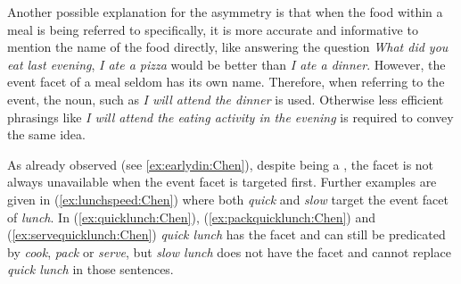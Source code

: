 \documentclass[output=paper,colorlinks,citecolor=brown,chinesefont]{langscibook}
\begin{document}
Another possible explanation for the asymmetry is that when the food within a meal is being referred to specifically, it is more accurate and informative to mention the name of the food directly, like answering the question \emph{What did you eat last evening}, \emph{I ate a pizza} would be better than \emph{I ate a dinner}. However, the event facet of a meal seldom has its own name. 
Therefore, when referring to the event, the  noun, such as \emph{I will attend the dinner} is used. Otherwise less efficient phrasings like \emph{I will attend the eating activity in the evening} is required to convey the same idea.

As already observed (see \ref{ex:earlydin:Chen}), despite being a , the  facet is not always unavailable when the event facet is targeted first. Further examples are given in (\ref{ex:lunchspeed:Chen}) where  both \emph{quick} and \emph{slow} target the event facet of \emph{lunch}. In (\ref{ex:quicklunch:Chen}), (\ref{ex:packquicklunch:Chen}) and (\ref{ex:servequicklunch:Chen}) \emph{quick lunch} has the  facet and can still be predicated by \emph{cook}, \emph{pack} or \emph{serve}, but \emph{slow lunch} does not have the  facet and cannot replace \emph{quick lunch} in those sentences.

\ea \label{ex:lunchspeed:Chen}
 \label{ex:quicklunch:Chen}
 \label{ex:slowlunch:Chen}
 \label{ex:packquicklunch:Chen}
 \label{ex:packslowlunch:Chen}
 \label{ex:servequicklunch:Chen}
\z\z
\end{document}
